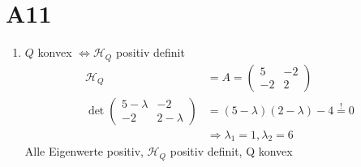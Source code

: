 \documentclass[fleqn,12pt]{scrartcl}
\begin{document}
\section{A11}

\begin{enumerate}
	\item
		$Q$ konvex $\Leftrightarrow \mathcal{H}_Q$ positiv definit\\
		\begin{align*}
			\mathcal{H}_Q &= A = \begin{pmatrix}
			5 &-2 \\
		-2 & 2 \end{pmatrix}\\
			\det \begin{pmatrix}
				5-\lambda & -2 \\
			-2 & 2-\lambda \end{pmatrix} &= (5-\lambda)(2-\lambda)-4 \overset!= 0\\
					&\Rightarrow \lambda_1 = 1, \lambda_2 = 6
		\end{align*}
		Alle Eigenwerte positiv, $\mathcal{H}_Q$ positiv definit, Q konvex


\end{enumerate}
\end{document}
